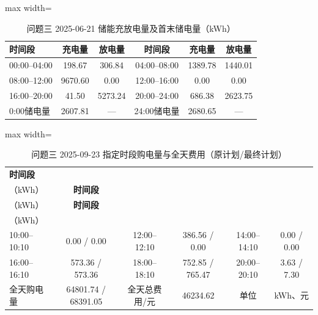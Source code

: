 \documentclass[UTF8,a4paper,zihao=-4,fontset=windows]{ctexart}
\begin{document}
\begin{table}[H]\centering
\fontsize{9.5}{12}\selectfont\setlength{\tabcolsep}{4pt}\renewcommand{\arraystretch}{1.12}
\begin{adjustbox}{max width=\linewidth}\begin{tabular}{lccccc}\toprule
\textbf{时间段} & \textbf{充电量} & \textbf{放电量} & \textbf{时间段} & \textbf{充电量} & \textbf{放电量}\\\midrule
00:00–04:00 & 198.67 & 306.84 & 04:00–08:00 & 1389.78 & 1440.01\\
08:00–12:00 & 9670.60 & 0.00 & 12:00–16:00 & 0.00 & 0.00\\
16:00–20:00 & 41.50 & 5273.24 & 20:00–24:00 & 686.38 & 2623.75\\
0:00储电量 & 2607.81 & — & 24:00储电量 & 2680.65 & —\\
\bottomrule\end{tabular}\end{adjustbox}
\caption{问题三 2025-06-21 储能充放电量及首末储电量（kWh）}
\end{table}
\begin{table}[H]\centering
\fontsize{9.5}{12}\selectfont\setlength{\tabcolsep}{4pt}\renewcommand{\arraystretch}{1.12}
\begin{adjustbox}{max width=\linewidth}\begin{tabular}{lccccc}\toprule
\textbf{时间段} & \shortstack{\textbf{购电量}\\{\normalfont （kWh）}} & \textbf{时间段} & \shortstack{\textbf{购电量}\\{\normalfont （kWh）}} & \textbf{时间段} & \shortstack{\textbf{购电量}\\{\normalfont （kWh）}}\\\midrule
10:00–10:10 & 0.00 / 0.00 & 12:00–12:10 & 386.56 / 0.00 & 14:00–14:10 & 0.00 / 0.00\\
16:00–16:10 & 573.36 / 573.36 & 18:00–18:10 & 752.85 / 765.47 & 20:00–20:10 & 3.63 / 7.30\\
全天购电量 & 64801.74 / 68391.05 & 全天总费用/元 & 46234.62 & 单位 & kWh、元\\
\bottomrule\end{tabular}\end{adjustbox}
\caption{问题三 2025-09-23 指定时段购电量与全天费用（原计划/最终计划）}
\end{table}
\end{document}
